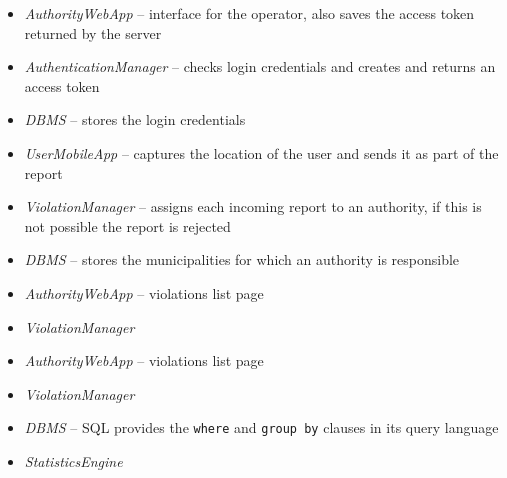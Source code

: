 \begin{description}
    \begin{itemize}
        \item \emph{AuthorityWebApp} -- interface for the operator, also saves
        the access token returned by the server
        \item \emph{AuthenticationManager} -- checks login credentials and
        creates and returns an access token
        \item \emph{DBMS} -- stores the login credentials
    \end{itemize}

    \begin{itemize}
        \item \emph{UserMobileApp} -- captures the location of the user and
        sends it as part of the report
        \item \emph{ViolationManager} -- assigns each incoming report to an
        authority, if this is not possible the report is rejected
        \item \emph{DBMS} -- stores the municipalities for which an authority
        is responsible
    \end{itemize}

    \begin{itemize}
        \item \emph{AuthorityWebApp} -- violations list page
        \item \emph{ViolationManager}
    \end{itemize}

    \begin{itemize}
        \item \emph{AuthorityWebApp} -- violations list page
        \item \emph{ViolationManager}
    \end{itemize}

    \begin{itemize}
        \item \emph{DBMS} -- SQL provides the \texttt{where} and \texttt{group
        by} clauses in its query language
    \end{itemize}

    \begin{itemize}
        \item \emph{StatisticsEngine}
    \end{itemize}


\end{description}
